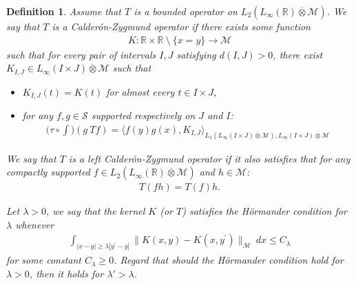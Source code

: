 \documentclass[10pt,a4paper]{amsart}
\newtheorem{definition}{Definition}
\newcommand{\Avnat}{\Linfty(\mathbb{R}) \overline{\otimes} \mathcal{M}}
\newcommand{\Linfty}{L_\infty}
\newcommand{\Lone}{L_1}
\newcommand{\Ltwo}{L_2}
\begin{document}
    \begin{definition}\label{def:CZ}
        Assume that $T$ is a bounded operator on $\Ltwo(\Linfty(\mathbb{R}) {\overline{\otimes}} \mathcal{M})$. We say that $T$ is a \emph{Calder\'on-Zygmund operator} if there exists some function
        \begin{align*}
            K : \mathbb{R} \times \mathbb{R} \ \setminus \ \{x=y\} \longrightarrow \mathcal{M}
        \end{align*}
        such that for every pair of intervals $I,J$ satisfying $d(I,J) > 0$, there exist $K_{I,J} \in \Linfty(I \times J) \overline{\otimes} \mathcal{M}$ such that
        \begin{itemize}
          \item ${K}_{I,J}(t) = K(t)$ for  almost every $t \in I \times J$,
 \item   for any $f,g \in \mathcal S$ supported respectively on $J$ and $I$:  \begin{align}\label{dissup}
            \Big(\tau \circ \int\Big)(g \ Tf) = \langle f(y)g(x), K_{I,J} \rangle_{\Lone(\Linfty(I\times J)\overline{\otimes} \mathcal{M}),\Linfty(I \times J)\overline{\otimes} \mathcal{M}}
        \end{align}
      \end{itemize}
      
        We say that $T$ is a \emph{left Calder\'on-Zygmund operator} if it also  satisfies that for any compactly supported $f \in \Ltwo(\Avnat)$ and $h \in \mathcal{M}$:
        \begin{align*}
            T(fh) = T(f)h. 
        \end{align*}

      
       Let $\lambda>0$, we say that the kernel $K$ (or $T$) satisfies the \emph{Hörmander condition} for $\lambda$ whenever
        \begin{align}\label{eq:hormanderCondition}
            \int_{|x-y| \geq \lambda |y^\prime-y|} \|K(x,y) - K(x,y^\prime)\|_{\mathcal{M}} \ dx \leq C_\lambda
        \end{align}
        for some constant $C_\lambda \geq 0$.  Regard that should the Hörmander condition hold for $\lambda > 0$, then it holds for $\lambda' > \lambda$.
    \end{definition}
\end{document}
